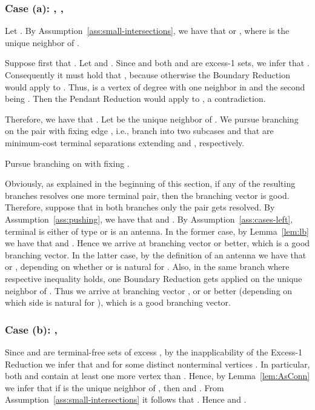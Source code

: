 \subsubsection{Case (a): , , }



Let . By Assumption~\ref{ass:small-intersections}, we have that  or , where  is the unique neighbor of . 

Suppose first that . Let  and . Since  and both  and  are excess-1 sets, we infer that . Consequently it must hold that , because otherwise the Boundary Reduction would apply to . Thus,  is a vertex of degree  with one neighbor  in  and the second being . Then the Pendant Reduction would apply to , a contradiction.

Therefore, we have that . Let  be the unique neighbor of . We pursue branching on the pair  with fixing edge , i.e., branch into two subcases  and  that are minimum-cost terminal separations extending  and , respectively.

\begin{branching}
Pursue branching on  with fixing .
\end{branching}

Obviously, as explained in the beginning of this section, if any of the resulting branches resolves one more terminal pair, then the branching vector is good. Therefore, suppose that in both branches only the pair  gets resolved. By Assumption~\ref{ass:pushing}, we have that  and . By Assumption~\ref{ass:cases-left}, terminal  is either of type  or is an antenna. In the former case, by Lemma~\ref{lem:lb} we have that  and . Hence we arrive at branching vector  or better, which is a good branching vector. In the latter case, by the definition of an antenna we have that  or , depending on whether  or  is natural for . Also, in the same branch where respective inequality holds, one Boundary Reduction gets applied on the unique neighbor of . Thus we arrive at branching vector , or  or better (depending on which side is natural for ), which is a good branching vector.





\subsubsection{Case (b): , }



Since  and  are terminal-free sets of excess , by the inapplicability of the Excess-1 Reduction we infer that  and  for some distinct nonterminal vertices . In particular, both  and  contain at least one more vertex than . Hence, by Lemma~\ref{lem:AsConn} we infer that if  is the unique neighbor of , then  and . From Assumption~\ref{ass:small-intersections} it follows that . Hence  and .

